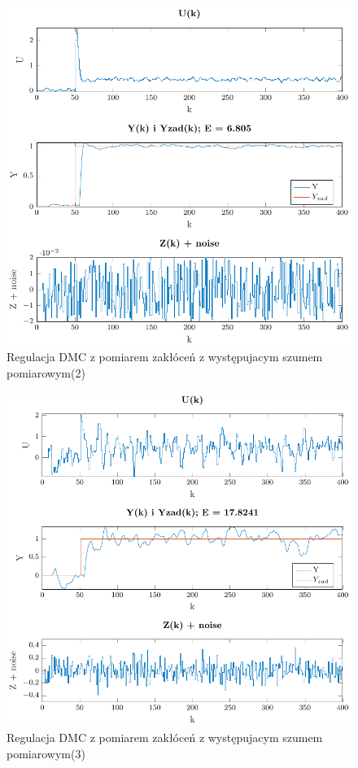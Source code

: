 \documentclass[a4paper,titlepage,11pt,twosides,floatssmall]{mwrep}
\begin{document}
\begin{figure}[h]
	\centering
	\includegraphics[scale=0.85]{../../Lab2/PDF_rysunki/Z7_Szum2.pdf}
	\caption{Regulacja DMC z pomiarem zakłóceń z występujacym szumem pomiarowym(2)}
	\label{szum2}
\end{figure}


\begin{figure}[h]
	\centering
	\includegraphics[scale=0.85]{../../Lab2/PDF_rysunki/Z7_Szum3.pdf}
	\caption{Regulacja DMC z pomiarem zakłóceń z występujacym szumem pomiarowym(3)}
	\label{szum3}
\end{figure}
\end{document}
